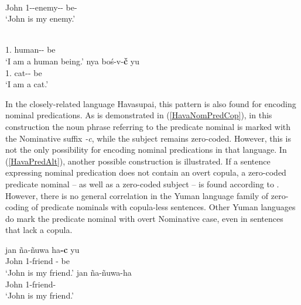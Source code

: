 \begin{exe}\ex\label{YavNomPred}
\gll {}  \\
John 1-\poss{}-enemy-\dem{}-\nom{} be-\faff{}\\
\glt `John is my enemy.' \end{exe}

\begin{exe}\ex\label{WalNomPred}
\begin{xlist}\ex 
\gll {}  \\
1\sg{}.\acc{} human--\nom{} be\\
\glt `I am a human being.'
\ex \label{Hualapai.NomPred}
\gll nya bo\'s-v-\textbf{\v c} yu\\
1\sg{}.\acc{} cat--\nom{}  be\\
\glt `I am a cat.'
\end{xlist}
\end{exe}

In the closely-related language Havasupai, this pattern is also found for encoding nominal predications. 
As is demonstrated in (\ref{HavaNomPredCop}), in this construction the noun phrase referring to the predicate nominal is marked with the Nominative suffix \emph{-c}, while the subject remains zero-coded. 
However, this is not the only possibility for encoding nominal predications in that language.  
In (\ref{HavaPredAlt}), another possible construction is illustrated. 
If a sentence expressing nominal predication does not contain an overt copula, a zero-coded predicate nominal -- as well as a zero-coded subject -- is found according to \citet{Kozlowski:1972}. 
However, there is no general correlation in the Yuman language family of zero-coding of predicate nominals with copula-less sentences. 
Other Yuman languages do mark the predicate nominal with overt Nominative case, even in sentences that lack a copula.  


\begin{exe}\ex\label{HavNomPred}
\begin{xlist}
\ex\label{HavaNomPredCop}\gll jan \~na-\~nuwa ha\textbf{-c} yu\\
John 1-friend \dem{}-\nom{} be\\
\glt `John is my friend.' 
\ex\label{HavaPredAlt}\gll jan \~na-\~nuwa-ha\\
John 1-friend-\dem{}\\
\glt `John is my friend.'
\end{xlist}
\end{exe}

